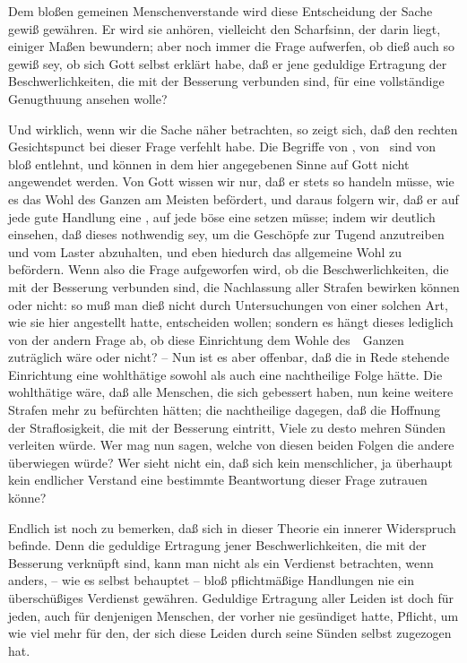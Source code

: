 \begin{aufzb}
\item Dem bloßen gemeinen Menschenverstande wird diese Entscheidung der Sache gewiß  gewähren. Er wird sie anhören, vielleicht den Scharfsinn, der darin liegt, einiger Maßen bewundern; aber noch immer die Frage aufwerfen, ob dieß auch so gewiß sey, ob sich Gott selbst erklärt habe, daß er jene geduldige Ertragung der Beschwerlichkeiten, die mit der Besserung verbunden sind, für eine vollständige Genugthuung ansehen wolle?
\item Und wirklich, wenn wir die Sache näher betrachten, so zeigt sich, daß  den rechten Gesichtspunct bei dieser Frage verfehlt habe. Die Begriffe von , von  \usw\ sind von bloß  entlehnt, und können in dem hier angegebenen Sinne auf Gott nicht angewendet werden. Von Gott wissen wir nur, daß er stets so handeln müsse, wie es das Wohl des Ganzen am Meisten befördert, und daraus folgern wir, daß er auf jede gute Handlung eine , auf jede böse eine  setzen müsse; indem wir deutlich einsehen, daß dieses nothwendig sey, um die Geschöpfe zur Tugend anzutreiben und vom Laster abzuhalten, und eben hiedurch das allgemeine Wohl zu befördern. Wenn also die Frage aufgeworfen wird, ob die Beschwerlichkeiten, die mit der Besserung verbunden sind, die Nachlassung aller Strafen bewirken können oder nicht: so muß man dieß nicht durch Untersuchungen von einer solchen Art, wie sie hier  angestellt hatte, entscheiden wollen; sondern es hängt dieses lediglich von der andern Frage ab, ob diese Einrichtung dem Wohle des~\ Ganzen zuträglich wäre oder nicht? -- Nun ist es aber offenbar, daß die in Rede stehende Einrichtung eine wohlthätige sowohl als auch eine nachtheilige Folge hätte. Die wohlthätige wäre, daß alle Menschen, die sich gebessert haben, nun keine weitere Strafen mehr zu befürchten hätten; die nachtheilige dagegen, daß die Hoffnung der Straflosigkeit, die mit der Besserung eintritt, Viele zu desto mehren Sünden verleiten würde. Wer mag nun sagen, welche von diesen beiden Folgen die andere überwiegen würde? Wer sieht nicht ein, daß sich kein menschlicher, ja überhaupt kein endlicher Verstand eine bestimmte Beantwortung dieser Frage zutrauen könne?
\item Endlich ist noch zu bemerken, daß sich in dieser  Theorie ein innerer Widerspruch befinde. Denn die geduldige Ertragung jener Beschwerlichkeiten, die mit der Besserung verknüpft sind, kann man nicht als ein  Verdienst betrachten, wenn anders, -- wie es  selbst behauptet -- bloß pflichtmäßige Handlungen nie ein überschüßiges Verdienst gewähren. Geduldige Ertragung aller Leiden ist doch für jeden, auch für denjenigen Menschen, der vorher nie gesündiget hatte, Pflicht, um wie viel mehr für den, der sich diese Leiden durch seine Sünden selbst zugezogen hat.
\end{aufzb}
